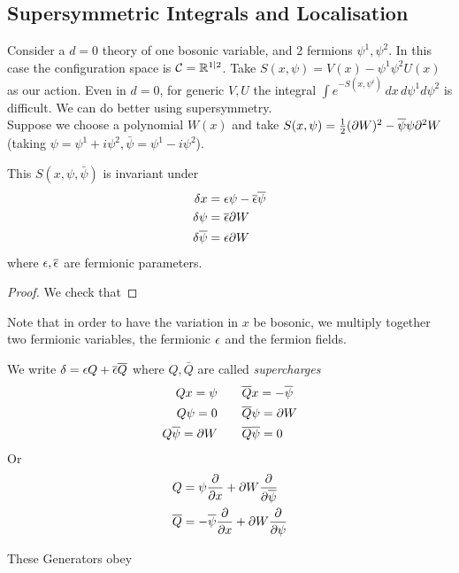 \documentclass{article}
\begin{document}
\subsection{Supersymmetric Integrals and Localisation}
Consider a $d=0$ theory of one bosonic variable, and 2 fermions  $\psi^1,\psi^2$. In this case the configuration space is $\mathcal{C} = \mathbb{R}^{1|2}$.  Take $S(x,\psi) = V(x)-\psi^1 \psi^2 U(x)$ as our action. Even in $d=0$, for generic $V,U$ the integral $\int e^{-S(x,\psi^i)}\, dx \, d\psi^1 d\psi^2$ is difficult. We can do better using supersymmetry.\\
Suppose we choose a polynomial $W(x)$ and take $S(x,\psi) = \frac{1}{2} (\partial W)^2 - \overline{\psi} \psi \partial^2 W$ (taking $\psi = \psi^1 + i \psi^2, \bar{\psi} = \psi^1 -i \psi^2$). 
\begin{lemma}
	This $S(x,\psi,  \bar{\psi})$ is invariant under 
\begin{align*}
\delta x &= \epsilon \psi - \overline{\epsilon} \overline{\psi} \\
\delta \psi &= \overline{\epsilon} \partial W \\
\delta \overline{\psi} &= \epsilon \partial W 
\end{align*}
where $\epsilon,\overline{\epsilon}$ are fermionic parameters.
\end{lemma}
\begin{proof}
We check that
\end{proof}
\begin{remark}
	Note that in order to have the variation in $x$ be bosonic, we multiply together two fermionic variables, the fermionic $\epsilon$ and the fermion fields. 
\end{remark}
We write $\delta = \epsilon Q + \overline{\epsilon} \overline{Q}$ where $Q,\bar{Q}$ are called \emph{supercharges}
\begin{align*}
    Qx = \psi &\qquad \overline{Q}x = -\overline{\psi} \\
    Q \psi = 0 &\qquad \overline{Q} \psi = \partial W \\
    Q \overline{\psi} = \partial W &\qquad \overline{Q} \overline{\psi} = 0
\end{align*}
Or 
\begin{align*}
    Q &= \psi \frac{\partial}{\partial x} + \partial W \frac{\partial}{\partial\overline{\psi}} \\
    \overline{Q} &= -\overline{\psi} \frac{\partial}{\partial x} + \partial W \frac{\partial}{\partial\psi}
\end{align*}
\begin{prop}
These Generators obey 
\end{prop}
\end{document}
